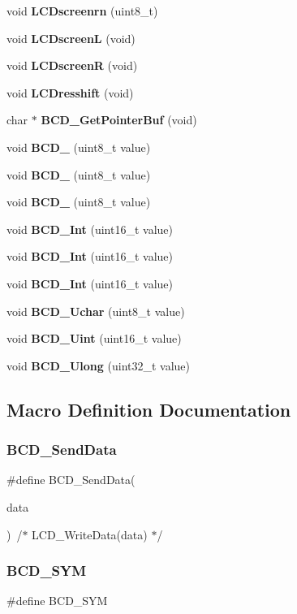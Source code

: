 \begin{DoxyCompactItemize}
void \textbf{ L\+C\+Dscreenrn} (uint8\+\_\+t)
\item 
void \textbf{ L\+C\+DscreenL} (void)
\item 
void \textbf{ L\+C\+DscreenR} (void)
\item 
void \textbf{ L\+C\+Dresshift} (void)
\item 
char $\ast$ \textbf{ B\+C\+D\+\_\+\+Get\+Pointer\+Buf} (void)
\item 
void \textbf{ B\+C\+D\+\_} (uint8\+\_\+t value)
\item 
void \textbf{ B\+C\+D\+\_} (uint8\+\_\+t value)
\item 
void \textbf{ B\+C\+D\+\_} (uint8\+\_\+t value)
\item 
void \textbf{ B\+C\+D\+\_\+Int} (uint16\+\_\+t value)
\item 
void \textbf{ B\+C\+D\+\_\+Int} (uint16\+\_\+t value)
\item 
void \textbf{ B\+C\+D\+\_\+Int} (uint16\+\_\+t value)
\item 
void \textbf{ B\+C\+D\+\_\+\+Uchar} (uint8\+\_\+t value)
\item 
void \textbf{ B\+C\+D\+\_\+\+Uint} (uint16\+\_\+t value)
\item 
void \textbf{ B\+C\+D\+\_\+\+Ulong} (uint32\+\_\+t value)
\end{DoxyCompactItemize}


\subsection{Macro Definition Documentation}
\mbox{\label{lcd_8h_af37894aa9343439b64d5b5c0d0cc7f09}} 
\subsubsection{B\+C\+D\+\_\+\+Send\+Data}
{\footnotesize\ttfamily \#define B\+C\+D\+\_\+\+Send\+Data(\begin{DoxyParamCaption}\item[{}]{data }\end{DoxyParamCaption})~/$\ast$ L\+C\+D\+\_\+\+Write\+Data(data) $\ast$/}

\mbox{\label{lcd_8h_a9a0c5b8aef1342cb554ca3b64fbb1887}} 
\subsubsection{B\+C\+D\+\_\+\+S\+YM}
{\footnotesize\ttfamily \#define B\+C\+D\+\_\+\+S\+YM}

